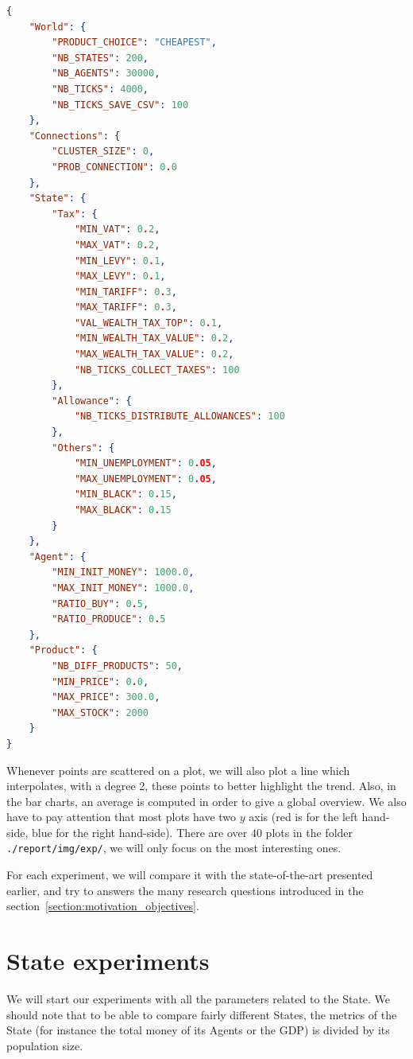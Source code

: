\begin{lstlisting}[language=json,firstnumber=1]
{
    "World": {
        "PRODUCT_CHOICE": "CHEAPEST",
        "NB_STATES": 200,
        "NB_AGENTS": 30000,
        "NB_TICKS": 4000,
        "NB_TICKS_SAVE_CSV": 100
    },
    "Connections": {
        "CLUSTER_SIZE": 0,
        "PROB_CONNECTION": 0.0
    },
    "State": {
        "Tax": {
            "MIN_VAT": 0.2,
            "MAX_VAT": 0.2,
            "MIN_LEVY": 0.1,
            "MAX_LEVY": 0.1,
            "MIN_TARIFF": 0.3,
            "MAX_TARIFF": 0.3,
            "VAL_WEALTH_TAX_TOP": 0.1,
            "MIN_WEALTH_TAX_VALUE": 0.2,
            "MAX_WEALTH_TAX_VALUE": 0.2,
            "NB_TICKS_COLLECT_TAXES": 100
        },
        "Allowance": {
            "NB_TICKS_DISTRIBUTE_ALLOWANCES": 100
        },
        "Others": {
            "MIN_UNEMPLOYMENT": 0.05,
            "MAX_UNEMPLOYMENT": 0.05,
            "MIN_BLACK": 0.15,
            "MAX_BLACK": 0.15
        }
    },
    "Agent": {
        "MIN_INIT_MONEY": 1000.0,
        "MAX_INIT_MONEY": 1000.0,
        "RATIO_BUY": 0.5,
        "RATIO_PRODUCE": 0.5
    },
    "Product": {
        "NB_DIFF_PRODUCTS": 50,
        "MIN_PRICE": 0.0,
        "MAX_PRICE": 300.0,
        "MAX_STOCK": 2000
    }
}
\end{lstlisting}

Whenever points are scattered on a plot, we will also plot a line which interpolates, with a degree 2, these points to better highlight the trend. Also, in the bar charts, an average is computed in order to give a global overview. We also have to pay attention that most plots have two $y$ axis (red is for the left hand-side, blue for the right hand-side). There are over 40 plots in the folder \texttt{./report/img/exp/}, we will only focus on the most interesting ones.

For each experiment, we will compare it with the state-of-the-art presented earlier, and try to answers the many research questions introduced in the section~\ref{section:motivation_objectives}.


\section{State experiments}

We will start our experiments with all the parameters related to the State. We should note that to be able to compare fairly different States, the metrics of the State (for instance the total money of its Agents or the GDP) is divided by its population size. 

